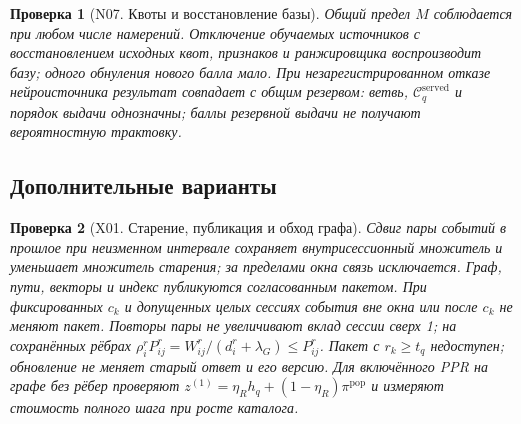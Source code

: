 \documentclass[12pt,a4paper]{article}
\theoremstyle{plainru}
\newtheorem{testcase}{Проверка}[section]
\begin{document}
\begin{testcase}[N07. Квоты и восстановление базы]
Общий предел $M$ соблюдается при любом числе намерений.
Отключение обучаемых источников с восстановлением исходных квот,
признаков и ранжировщика воспроизводит базу; одного обнуления нового балла мало.
При незарегистрированном отказе нейроисточника результат совпадает
с общим резервом: ветвь, $\mathcal C_q^{\mathrm{served}}$ и порядок выдачи
однозначны; баллы резервной выдачи не получают вероятностную трактовку.
\end{testcase}

\subsection{Дополнительные варианты}\label{app:tests-extra}

\begin{testcase}[X01. Старение, публикация и обход графа]
Сдвиг пары событий в прошлое при неизменном интервале сохраняет
внутрисессионный множитель и уменьшает множитель старения;
за пределами окна связь исключается. Граф, пути, векторы и индекс
публикуются согласованным пакетом.
При фиксированных $c_k$ и допущенных целых сессиях события вне окна или после
$c_k$ не меняют пакет. Повторы пары не увеличивают вклад сессии сверх 1;
на сохранённых рёбрах $\rho_i^rP_{ij}^r=W_{ij}^r/(d_i^r+\lambda_G)\le P_{ij}^r$.
Пакет с $r_k\ge t_q$ недоступен; обновление не меняет старый ответ и его версию.
Для включённого PPR на графе без рёбер проверяют
$z^{(1)}=\eta_Rh_q+(1-\eta_R)\pi^{\mathrm{pop}}$
и измеряют стоимость полного шага при росте каталога.
\end{testcase}
\end{document}
